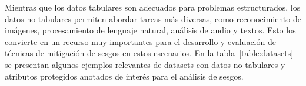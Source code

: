     Mientras que los datos tabulares son adecuados para problemas estructurados, los datos no tabulares permiten abordar tareas m\'as diversas, 
    como reconocimiento de im\'agenes, procesamiento de lenguaje natural, an\'alisis de audio y textos. Esto los convierte en un recurso muy importantes
    para el desarrollo y evaluaci\'on de t\'ecnicas de mitigaci\'on de sesgos en estos escenarios. En la tabla~\ref{table:datasets} 
    se presentan algunos ejemplos relevantes de datasets con datos no tabulares y atributos protegidos anotados de inter\'es para el 
    an\'alisis de sesgos.


